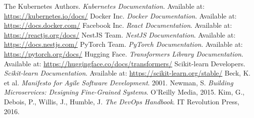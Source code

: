 \documentclass[12pt,a4paper]{report}
\begin{document}
\begin{thebibliography}{99}
 The Kubernetes Authors. \textit{Kubernetes Documentation}. Available at: \url{https://kubernetes.io/docs/}
 Docker Inc. \textit{Docker Documentation}. Available at: \url{https://docs.docker.com/}
 Facebook Inc. \textit{React Documentation}. Available at: \url{https://reactjs.org/docs/}
 NestJS Team. \textit{NestJS Documentation}. Available at: \url{https://docs.nestjs.com/}
 PyTorch Team. \textit{PyTorch Documentation}. Available at: \url{https://pytorch.org/docs/}
 Hugging Face. \textit{Transformers Library Documentation}. Available at: \url{https://huggingface.co/docs/transformers/}
 Scikit-learn Developers. \textit{Scikit-learn Documentation}. Available at: \url{https://scikit-learn.org/stable/}
 Beck, K. et al. \textit{Manifesto for Agile Software Development}. 2001.
 Newman, S. \textit{Building Microservices: Designing Fine-Grained Systems}. O'Reilly Media, 2015.
 Kim, G., Debois, P., Willis, J., Humble, J. \textit{The DevOps Handbook}. IT Revolution Press, 2016.
\end{thebibliography}

\appendix




\end{document}
